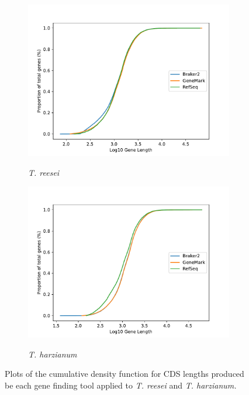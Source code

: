 \begin{figure}
  \centering
  \begin{subfigure}{0.7\textwidth}
    \includegraphics[width=\textwidth]{figures/t-reesei-cdf-lengths-log.pdf}
    \label{fig:treesei-lengths}
    \caption{\textit{T. reesei}}
  \end{subfigure}
  \begin{subfigure}{0.7\textwidth}
    \includegraphics[width=\textwidth]{figures/t-harzianum-cdf-lengths-log.pdf}
    \label{fig:tharzianum-lengths}
    \caption{\textit{T. harzianum}}
  \end{subfigure}
  \caption[CDF plots part 2.]{Plots of the cumulative density function
    for CDS lengths produced be each gene finding tool applied to
    \textit{T. reesei} and \textit{T. harzianum.}}
  \label{fig:cdf-lengths-2}
\end{figure}

